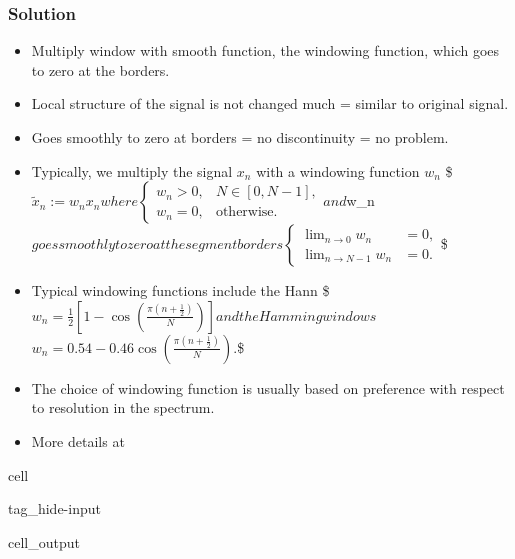 \documentclass[letterpaper,10pt,english]{jupyterBook}
\begin{document}
\subsubsection{Solution}
\label{\detokenize{Representations/Short-time_analysis:solution}}\begin{itemize}
\item {} 
\sphinxAtStartPar
Multiply window with smooth function, the windowing function, which goes to zero at the borders.

\item {} 
\sphinxAtStartPar
Local structure of the signal is not changed much = similar to original signal.

\item {} 
\sphinxAtStartPar
Goes smoothly to zero at borders = no discontinuity = no problem.

\item {} 
\sphinxAtStartPar
Typically, we multiply the signal \(x_n\) with a windowing function \(w_n\)
\$\(
     \tilde x_n := w_n x_n
  \)\(
  where 
  \)\(
     \begin{cases}
       w_n > 0, & N\in[0,N-1], \\
       w_n = 0, & \text{otherwise}.
     \end{cases}
  \)\(
  and \)w\_n\( goes smoothly to zero at the segment borders
  \)\(
  \begin{cases}
    \lim_{n\rightarrow 0}w_n &= 0, \\
    \lim_{n\rightarrow N-1}w_n &= 0      .
  \end{cases}
  \)\$

\item {} 
\sphinxAtStartPar
Typical windowing functions include the Hann
\$\( w_n = \frac12\left[1 - \cos\left(\frac{\pi \left(n+\frac12\right)}{N}\right)\right] \)\(
and the Hamming windows
\)\( w_n = 0.54 - 0.46\cos\left(\frac{\pi \left(n+\frac12\right)}{N}\right). \)\$

\item {} 
\sphinxAtStartPar
The choice of windowing function is usually based on preference with respect to resolution in the spectrum.

\item {} 
\sphinxAtStartPar
More details at 

\end{itemize}

\begin{sphinxuseclass}{cell}
\begin{sphinxuseclass}{tag_hide-input}\begin{sphinxVerbatimOutput}

\begin{sphinxuseclass}{cell_output}
\noindent{}

\end{sphinxuseclass}\end{sphinxVerbatimOutput}

\end{sphinxuseclass}
\end{sphinxuseclass}
\end{document}

